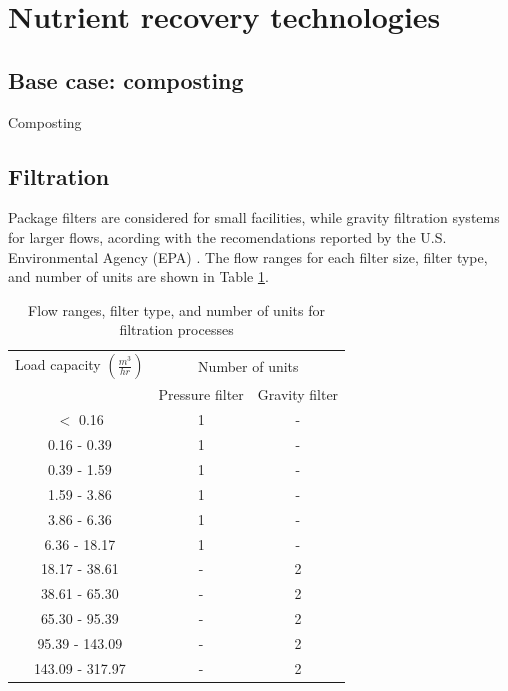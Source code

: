 \documentclass[10pt,a4paper]{article}
\begin{document}
\section{Nutrient recovery technologies}
\subsection{Base case: composting}
Composting

\subsection{Filtration}
Package filters are considered for small facilities, while gravity filtration systems for larger flows, acording with the recomendations reported by the U.S. Environmental Agency (EPA) \cite{EPAWWTPCosts_V2, EPAWWTPCosts_V3}. The flow ranges for each filter size, filter type, and number of units are shown in Table \ref{table:Filter_units}.

\begin{table}[H] 
	\begin{adjustwidth}{}{}
		\centering
		\caption{Flow ranges, filter type, and number of units for filtration processes \cite{EPAWWTPCosts_V2, EPAWWTPCosts_V3}} \label{table:Filter_units}
		\begin{tabular}{c c c }
			\toprule
			\multicolumn{1}{c}{Load capacity $\left(\frac{m^{3}}{hr}\right)$}&\multicolumn{2}{c}{Number of units}\\
			\cmidrule(lr){2-3}
			&Pressure filter & Gravity filter 	\\ \midrule
			$<$ 0.16 		& \cellcolor{blue!25}1 		& - 	\\
			0.16 - 0.39 	& \cellcolor{blue!25}1		& - 	\\
			0.39 - 1.59 	& \cellcolor{blue!25}1		& - 	\\
			1.59 - 3.86 	& \cellcolor{blue!25}1		& -		\\ 
			3.86 - 6.36 	& \cellcolor{blue!25}1		& -		\\ 
			6.36 - 18.17 	& \cellcolor{blue!25}1		& -	 	\\ 
			18.17 - 38.61 	& -							& \cellcolor{blue!25}2	\\
			38.61 - 65.30   & -							& \cellcolor{blue!25}2 	\\
			65.30 - 95.39  	& -							& \cellcolor{blue!25}2 	\\
			95.39 - 143.09  & -							& \cellcolor{blue!25}2 	\\
			143.09 - 317.97 & -							& \cellcolor{blue!25}2 	\\
		\end{tabular}
	\end{adjustwidth}
\end{table}
\end{document}

